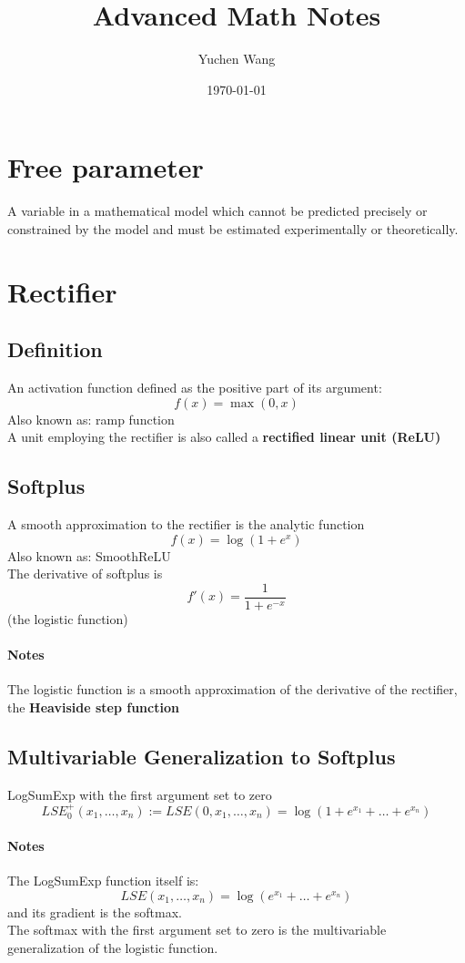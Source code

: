 \documentclass[11pt]{article}
\title{Advanced Math Notes}
\author{Yuchen Wang}
\date{\today}
\newcommand{\tb}[1]{\textbf{#1}}
\begin{document}
	\maketitle
	\tableofcontents
	\newpage
	\section{Free parameter}
	A variable in a mathematical model which cannot be predicted precisely or constrained by the model and must be estimated experimentally or theoretically.
	\section{Rectifier}
	\subsection{Definition}
	An activation function defined as the positive part of its argument:
	$$f(x) = \max(0,x)$$
	Also known as: ramp function \\
	A unit employing the rectifier is also called a \tb{rectified linear unit (ReLU)}
	\subsection{Softplus}
	A smooth approximation to the rectifier is the analytic function $$f(x) = \log(1+e^x)$$
	Also known as: SmoothReLU\\
	The derivative of softplus is $$f'(x) = \frac{1}{1+e^{-x}}$$(the logistic function)
	\paragraph{Notes}
	The logistic function is a smooth approximation of the derivative of the rectifier, the \tb{Heaviside step function}
	\subsection{Multivariable Generalization to Softplus}
	LogSumExp with the first argument set to zero
	$$LSE_0^+(x_1,\hdots,x_n) := LSE(0,x_1,\hdots,x_n) = \log(1+e^{x_1} + \hdots + e^{x_n})$$
	\paragraph{Notes}
	The LogSumExp function itself is:
	$$LSE(x_1,\hdots,x_n) = \log(e^{x_1} + \hdots + e^{x_n})$$
	and its gradient is the softmax.\\
	The softmax with the first argument set to zero is the multivariable generalization of the logistic function.
\end{document}
